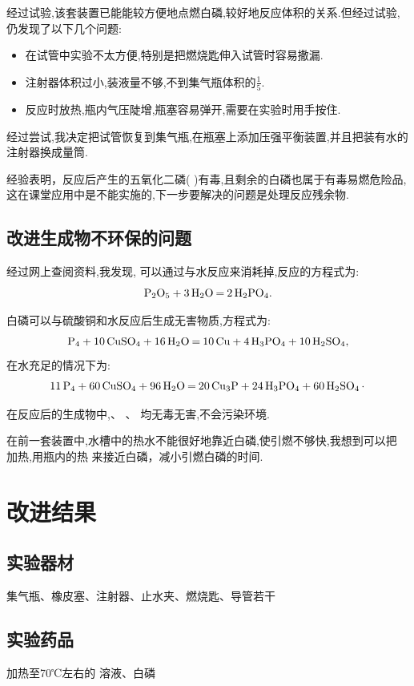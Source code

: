 \documentclass[11pt,a4paper,titlepage,twocolumn]{ctexart}
\begin{document}
	经过试验,该套装置已能能较方便地点燃白磷,较好地反应体积的关系.但经过试验,仍发现了以下几个问题:
	
	\begin{itemize}
		\item 在试管中实验不太方便,特别是把燃烧匙伸入试管时容易撒漏.
		\item 注射器体积过小,装液量不够,不到集气瓶体积的$\frac{1}{5}$.
		\item 反应时放热,瓶内气压陡增,瓶塞容易弹开,需要在实验时用手按住. 
	\end{itemize}
	
	经过尝试,我决定把试管恢复到集气瓶,在瓶塞上添加压强平衡装置,并且把装有水的注射器换成量筒.
	
	经验表明，反应后产生的五氧化二磷( )有毒,且剩余的白磷也属于有毒易燃危险品,这在课堂应用中是不能实施的,下一步要解决的问题是处理反应残余物.
	
	\subsection{改进生成物不环保的问题}
	
	经过网上查阅资料,我发现, 可以通过与水反应来消耗掉,反应的方程式为:
	\[ \ce{P2O5 + 3H2O = 2H2PO4}.\]
	
	白磷可以与硫酸铜和水反应后生成无害物质,方程式为:
	{\footnotesize \[ \ce{P4 + 10CuSO4 + 16H2O = 10Cu + 4H3PO4 + 10H2SO4},\]}
	在水充足的情况下为:{\scriptsize \[ \ce{11P4 + 60CuSO4 + 96H2O = 20Cu3P + 24H3PO4 + 60H2SO4.}\]}
	
	在反应后的生成物中,、 、 均无毒无害,不会污染环境.
	
	在前一套装置中,水槽中的热水不能很好地靠近白磷,使引燃不够快,我想到可以把 加热,用瓶内的热 来接近白磷，减小引燃白磷的时间.
	\section{改进结果}
	\subsection{实验器材}
	
	集气瓶、橡皮塞、注射器、止水夹、燃烧匙、导管若干
	
	\subsection{实验药品}
	
	加热至70℃左右的 溶液、白磷
	
\end{document}
